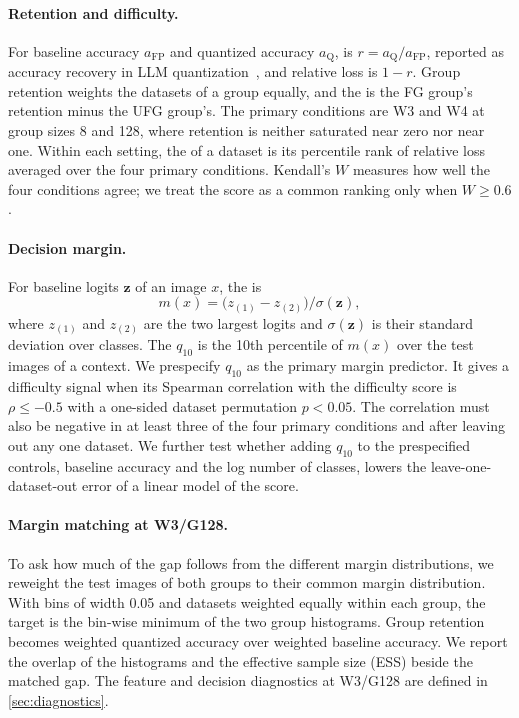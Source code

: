 \paragraph{Retention and difficulty.}
For baseline accuracy $a_{\mathrm{FP}}$ and quantized accuracy $a_{\mathrm{Q}}$,  is $r = a_{\mathrm{Q}} / a_{\mathrm{FP}}$, reported as accuracy recovery in LLM quantization~\cite{kurtic2025bf16}, and relative loss is $1-r$.
Group retention weights the datasets of a group equally, and the  is the FG group's retention minus the UFG group's.
The primary conditions are W3 and W4 at group sizes 8 and 128, where retention is neither saturated near zero nor near one.
Within each setting, the  of a dataset is its percentile rank of relative loss averaged over the four primary conditions.
Kendall's $W$ measures how well the four conditions agree; we treat the score as a common ranking only when $W \ge 0.6$.

\paragraph{Decision margin.}
For baseline logits $\bm{z}$ of an image $x$, the  is
\begin{equation}
  m(x) = \bigl(z_{(1)} - z_{(2)}\bigr) / \sigma(\bm{z}),
  \label{eq:margin}
\end{equation}
where $z_{(1)}$ and $z_{(2)}$ are the two largest logits and $\sigma(\bm{z})$ is their standard deviation over classes.
The  $q_{10}$ is the 10th percentile of $m(x)$ over the test images of a context.
We prespecify $q_{10}$ as the primary margin predictor.
It gives a difficulty signal when its Spearman correlation with the difficulty score is $\rho \le -0.5$ with a one-sided dataset permutation $p < 0.05$.
The correlation must also be negative in at least three of the four primary conditions and after leaving out any one dataset.
We further test whether adding $q_{10}$ to the prespecified controls, baseline accuracy and the log number of classes, lowers the leave-one-dataset-out error of a linear model of the score.

\paragraph{Margin matching at W3/G128.}
To ask how much of the gap follows from the different margin distributions, we reweight the test images of both groups to their common margin distribution.
With bins of width 0.05 and datasets weighted equally within each group, the target is the bin-wise minimum of the two group histograms.
Group retention becomes weighted quantized accuracy over weighted baseline accuracy.
We report the overlap of the histograms and the effective sample size (ESS) beside the matched gap.
The feature and decision diagnostics at W3/G128 are defined in \cref{sec:diagnostics}.
